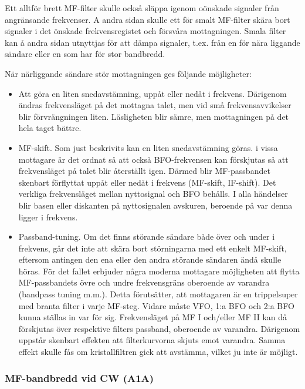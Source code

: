 Ett alltför brett MF-filter skulle också släppa igenom oönskade
signaler från angränsande frekvenser. A andra sidan skulle ett för
smalt MF-filter skära bort signaler i det önskade frekvensregistet och
försvåra mottagningen. Smala filter kan å andra sidan utnyttjas för
att dämpa signaler, t.ex. från en för nära liggande sändare eller en som
har för stor bandbredd.

När närliggande sändare stör mottagningen ges följande möjligheter:
\begin{itemize}
  \item Att göra en liten snedavstämning, uppåt eller nedåt i
    frekvens. Därigenom ändras frekvensläget på det mottagna talet,
    men vid små frekvensavvikelser blir förvrängningen
    liten. Läsligheten blir sämre, men mottagningen på det hela taget
    bättre.

  \item MF-skift. Som just beskrivits kan en liten snedavstämning
    göras. i vissa mottagare är det ordnat så att också BFO-frekvensen
    kan förskjutas så att frekvensläget på talet blir återställt
    igen. Därmed blir MF-passbandet skenbart förflyttat uppåt
    eller nedåt i frekvens (MF-skift, IF-shift).  Det verkliga
    frekvensläget mellan nyttosignal och BFO behålls. I alla händelser
    blir basen eller diskanten på nyttosignalen avskuren, beroende på
    var denna ligger i frekvens.

  \item Passband-tuning. Om det finns störande sändare både över och
    under i frekvens, går det inte att skära bort störningarna med ett
    enkelt MF-skift, eftersom antingen den ena eller den andra
    störande sändaren ändå skulle höras. För det fallet erbjuder några
    moderna mottagare möjligheten att flytta MF-passbandets övre och
    undre frekvensgräns oberoende av varandra (bandpass tuning
    m.m.). Detta förutsätter, att mottagaren är en trippelsuper med
    branta filter i varje MF-steg.  Vidare måste VFO, 1:a BFO och 2:a
    BFO kunna ställas in var för sig. Frekvensläget på MF I och/eller
    MF II kan då förskjutas över respektive filters passband,
    oberoende av varandra. Därigenom uppstår skenbart effekten att
    filterkurvorna skjuts emot varandra. Samma effekt skulle fås om
    kristallfiltren gick att avstämma, vilket ju inte är möjligt.
\end{itemize}

\subsubsection{MF-bandbredd vid CW (A1A)}

